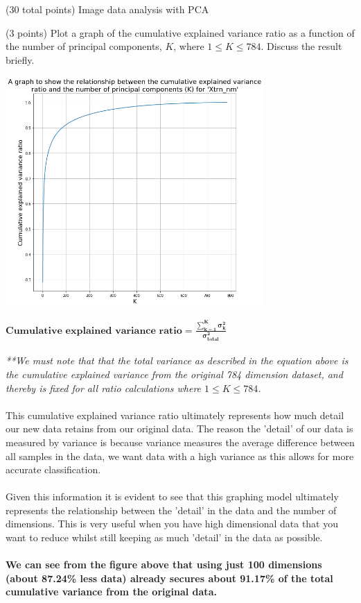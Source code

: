 \documentclass[12pt]{article}
\begin{document}
\begin{question}{(30 total points) Image data analysis with PCA}
\begin{subquestion}{(3 points)
       Plot a graph of the cumulative explained variance ratio as a function of the number of principal components, $K$, where $1\le K \le 784$.
       Discuss the result briefly.
     }
      \begin{answerbox}{54em}
        \begin{center}
         \includegraphics[width=0.74\textwidth]{images/q14.png}
        \end{center}
        \footnotesize{
        $\mathbf{Cumulative}$ $\mathbf{explained}$ $\mathbf{variance}$ $\mathbf{ratio = \frac{\sum_{k=1}^{K}\sigma_{k}^{2}}{\sigma_{total}^{2}}}$\\ 
\\
        \emph{**We must note that that the total variance as described in the equation above is the cumulative explained variance from the original 784 dimension dataset, and thereby is fixed for all ratio calculations where $1 \leq K \leq 784$.}\\
\\
        This cumulative explained variance ratio ultimately represents how much detail our new data retains from our original data. The reason the 'detail' of our data is measured by variance is because variance measures the average difference between all samples in the data, we want data with a high variance as this allows for more accurate classification.\\
\\
        Given this information it is evident to see that this graphing model ultimately represents the relationship between the 'detail' in the data and the number of dimensions. This is very useful when you have high dimensional data that you want to reduce whilst still keeping as much 'detail' in the data as possible.\\
\\
        \textbf{We can see from the figure above that using just 100 dimensions (about 87.24\% less data) already secures about 91.17\% of the total cumulative variance from the original data.}\\
}
\end{answerbox}
\end{subquestion}
\end{question}
\end{document}
